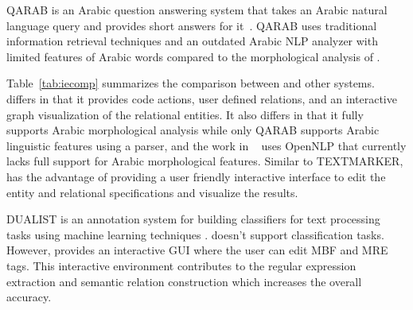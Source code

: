 QARAB is an Arabic question answering system that 
takes an Arabic natural language query and provides short answers for it~\cite{hammo2002qarab}. 
QARAB uses traditional information retrieval techniques and an outdated Arabic NLP 
analyzer with limited features of Arabic words compared 
to the morphological analysis of \framework. 

\begin{table}[tb!]
\caption{Comaprison of \framework with SystemT, 
TEXTMARKER, 
Urbain, 
QARAB}
\label{tab:iecomp}
\end{table}

Table~\ref{tab:iecomp} summarizes the comparison between \framework and
other systems. \framework differs in that it provides 
code actions, user defined relations, and an interactive 
graph visualization of the relational entities. 
It also differs in that it fully supports Arabic morphological analysis
while only QARAB supports Arabic linguistic features using a parser, and 
the work in ~\cite{urbain2012user} uses OpenNLP that currently lacks full
support for Arabic morphological features. 
Similar to TEXTMARKER, \framework has the advantage of providing 
a user friendly interactive interface to edit the entity and relational 
specifications and visualize the results. 

DUALIST is an annotation system for building classifiers for 
text processing tasks using machine learning techniques 
\cite{settles2011closing}. 
\framework doesn't support classification tasks. 
However, \framework provides an interactive GUI where the user can edit MBF and MRE tags.
This interactive environment contributes to the regular expression extraction 
and semantic relation construction which increases the overall accuracy.

